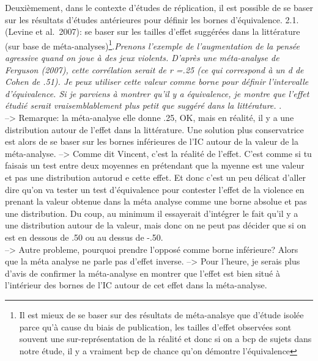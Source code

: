 \documentclass[
  english,
  man]{apa6}
\begin{document}
Deuxièmement, dans le contexte d'études de réplication, il est possible de se baser sur les résultats d'études antérieures pour définir les bornes d'équivalence.
2.1. (Levine et al.~2007): se baser sur les tailles d'effet suggérées dans la littérature (sur base de méta-analyses)\footnote{Il est mieux de se baser sur des résultats de méta-analsye que d'étude isolée parce qu'à cause du biais de publication, les tailles d'effet observées sont souvent une sur-représentation de la réalité et donc si on a bcp de sujets dans notre étude, il y a vraiment bcp de chance qu'on démontre l'équivalence}.\emph{Prenons l'exemple de l'augmentation de la pensée agressive quand on joue à des jeux violents. D'après une méta-analyse de Ferguson (2007), cette corrélation serait de r =.25 (ce qui correspond à un d de Cohen de .51). Je peux utiliser cette valeur comme borne pour définir l'intervalle d'équivalence. Si je parviens à montrer qu'il y a équivalence, je montre que l'effet étudié serait vraisemblablement plus petit que suggéré dans la littérature. }.\\
--\textgreater{} Remarque: la méta-analyse elle donne .25, OK, mais en réalité, il y a une distribution autour de l'effet dans la littérature. Une solution plus conservatrice est alors de se baser sur les bornes inférieures de l'IC autour de la valeur de la méta-analyse.
--\textgreater{} Comme dit Vincent, c'est la réalité de l'effet. C'est comme si tu faisais un test entre deux moyennes en prétendant que la myenne est une valeur et pas une distribution autorud e cette effet. Et donc c'est un peu délicat d'aller dire qu'on va tester un test d'équivalence pour contester l'effet de la violence en prenant la valeur obtenue dans la méta analyse comme une borne absolue et pas une distribution. Du coup, au minimum il essayerait d'intégrer le fait qu'il y a une distribution autour de la valeur, mais donc on ne peut pas décider que si on est en dessous de .50 ou au dessus de -.50.\\
--\textgreater{} Autre probleme, pourquoi prendre l'opposé comme borne inférieure? Alors que la méta analyse ne parle pas d'effet inverse.
--\textgreater{} Pour l'heure, je serais plus d'avis de confirmer la méta-analyse en montrer que l'effet est bien situé à l'intérieur des bornes de l'IC autour de cet effet dans la méta-analyse.
\end{document}
